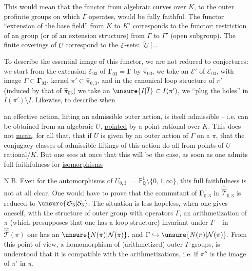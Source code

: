 This would mean that the functor from algebraic
curves over $K$, to the outer profinite groups
on which $\Gamma$ operates, would be fully faithful.
The functor ``extension of the base field'' from
$K$ to $K'$ corresponds to the functor: restriction
of an  group (or of an extension
structure) from $\Gamma$ to $\Gamma'$ (open subgroup).
The finite  coverings of $U$ correspond to the
$\mathcal E$-sets: [$\widetilde U$ ]\ldots

To describe the essential image of this
functor, we are not reduced to conjectures:
we start from the  extension $\mathcal E_{03}$ of $\boldsymbol{\Gamma}_{03}=\boldsymbol{\Gamma}$
by $\widehat{\pi}_{03}$, we take an   $\mathcal E'$
of $\mathcal E_{03}$, with image $\Gamma\subset\boldsymbol{\Gamma}_{03}$, kernel
$\pi'\subset\widehat{\pi}_{0,3}$, and in the canonical loop structure
of $\pi'$ (induced by that of $\widehat{\pi}_{03}$)
we take an $\unsure{I|\overline I}\subset I(\pi')$,  we ``plug the holes''
in $I(\pi')\setminus I$. Likewise, to describe when

an effective action, lifting an admissible outer
action, is itself admissible -- 
i.e. can be obtained from an algebraic 
$U$, \uline{pointed} by a point rational over $K$.
This does not \uline{mean}, for all that, that if
$U$ is given by an outer action of $\Gamma$ on a $\pi$,
that the conjugacy classes of admissible liftings
of this action do all  from
points of $U$ rational/$K$. But one sees at once that
this will be the case, as soon as one admits
full faithfulness for \uline{isomorphisms}

\uline{N.B.} Even for the automorphisms of $U_{0,3}$
$=\mathbb P^1_{\mathbb Q}\setminus\{0,1,\infty\}$, this full faithfulness is not
at all clear. One would have to prove that 
the commutant of $\boldsymbol{\Gamma}_{0,3}$ in $\widehat{\widehat{\mathcal T}}_{0,3}$ is reduced
to $\unsure{\mathfrak S_3|\mathcal S_3}$. The situation is less hopeless,
when one gives oneself, with the structure of
 outer group with operators $\Gamma$, an arithmetization
of $\pi$ (which presupposes that one has 
a loop structure) invariant under  $\Gamma$
--  in $\widehat{\widehat{\mathcal T}}(\pi)$ one has an $\unsure{N(\pi)|\mathcal N(\pi)}$,
and $\Gamma\hookrightarrow\unsure{N(\pi)|\mathcal N(\pi)}$. From this point of view,  a
homomorphism  of (arithmetized) outer $\Gamma$-groups,
 is understood that it is compatible with
the arithmetizations, i.e. if $\pi''$ is the image of $\pi'$ in $\pi$,

